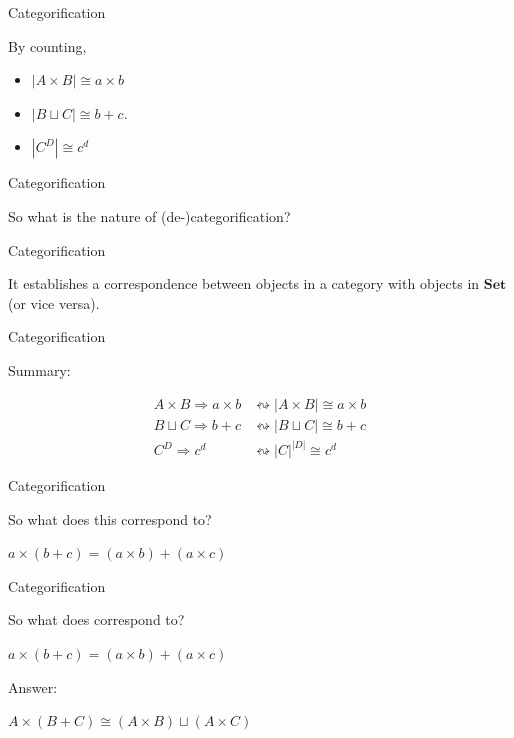 \documentclass[tikz]{beamer}
\theoremstyle{definition}
\newcommand{\cat}[1]{\mathbf{#1}}
\begin{document}
\begin{frame}{Categorification}

By counting,
    \begin{itemize}
        \item $|A \times B| \cong a \times b$
        \item $|B \sqcup C| \cong b + c$.
        \item $|C^D| \cong c ^ d$
    \end{itemize}
\end{frame}{}


\begin{frame}{Categorification}

So what is the nature of (de-)categorification?

\end{frame}

\begin{frame}{Categorification}

It establishes a correspondence between objects in a category with objects in $\cat{Set}$ (or vice versa).

\end{frame}


\begin{frame}{Categorification}

Summary:

\begin{align*}
    A \times B \Rightarrow a \times b &\leftrightsquigarrow |A \times B| \cong a \times b \\
    B \sqcup C \Rightarrow b + c &\leftrightsquigarrow |B \sqcup C| \cong b + c \\
    C^D \Rightarrow c^d &\leftrightsquigarrow |C|^{|D|} \cong c^d
\end{align*}
\end{frame}

\begin{frame}{Categorification}

    So what does this correspond to?

    \begin{block}{}
        $a \times (b + c) = (a \times b) + (a \times c) $
    \end{block}{}
\end{frame}{}

\begin{frame}{Categorification}

    So what does correspond to?

    \begin{block}{}
        $a \times (b + c) = (a \times b) + (a \times c) $
    \end{block}{}

 Answer:

\begin{block}{}
    $A \times (B + C) \cong (A \times B) \sqcup (A \times C)$
\end{block}{}

\end{frame}{}
\end{document}
